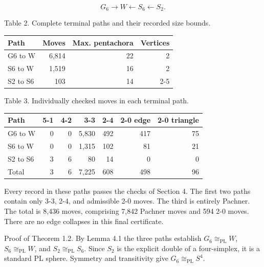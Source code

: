\documentclass[11pt,letterpaper]{article}
\begin{document}
\[
G_6\longrightarrow W\longleftarrow S_6\longleftarrow S_2.
\]
\noindent\begin{minipage}{\linewidth}
\begin{center}\small
Table 2. Complete terminal paths and their recorded size bounds.\par\smallskip
\begin{tabular}{lrrr}
\toprule
\textbf{Path} & \textbf{Moves} & \textbf{Max. pentachora} & \textbf{Vertices} \\
\midrule
G6 to W & 6,814 & 22 & 2 \\
S6 to W & 1,519 & 16 & 2 \\
S2 to S6 & 103 & 14 & 2-5 \\
\bottomrule
\end{tabular}
\end{center}
\end{minipage}\par\smallskip
\noindent\begin{minipage}{\linewidth}
\begin{center}\small
Table 3. Individually checked moves in each terminal path.\par\smallskip
\begin{tabular}{lrrrrrr}
\toprule
\textbf{Path} & \textbf{5-1} & \textbf{4-2} & \textbf{3-3} & \textbf{2-4} & \textbf{2-0 edge} & \textbf{2-0 triangle} \\
\midrule
G6 to W & 0 & 0 & 5,830 & 492 & 417 & 75 \\
S6 to W & 0 & 0 & 1,315 & 102 & 81 & 21 \\
S2 to S6 & 3 & 6 & 80 & 14 & 0 & 0 \\
Total & 3 & 6 & 7,225 & 608 & 498 & 96 \\
\bottomrule
\end{tabular}
\end{center}
\end{minipage}\par\smallskip
Every record in these paths passes the checks of Section 4. The first two paths contain only 3-3, 2-4, and admissible 2-0 moves. The third is entirely Pachner. The total is 8,436 moves, comprising 7,842 Pachner moves and 594 2-0 moves. There are no edge collapses in this final certificate.

Proof of Theorem 1.2. By Lemma 4.1 the three paths establish $G_6\cong_{\mathrm{PL}}W$, $S_6\cong_{\mathrm{PL}}W$, and $S_2\cong_{\mathrm{PL}}S_6$. Since $S_2$ is the explicit double of a four-simplex, it is a standard PL sphere. Symmetry and transitivity give $G_6\cong_{\mathrm{PL}}S^4$.
\end{document}
